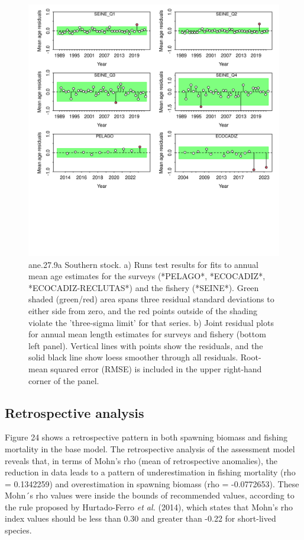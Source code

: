 \documentclass[
]{article}
\begin{document}
\begin{figure}[H]

{\centering \includegraphics[width=0.95\linewidth]{report/run/S1.0_4FLEETS_SelECO_RecIndex_Mnewfix/fig_runtest_residuals_age} 

}

\caption{ane.27.9a Southern stock. a) Runs test results for fits to annual mean age estimates for the surveys (*PELAGO*, *ECOCADIZ*, *ECOCADIZ-RECLUTAS*) and the fishery (*SEINE*). Green shaded (green/red) area spans three residual standard deviations to either side from zero, and the red points outside of the shading violate the 'three-sigma limit' for that series.  b) Joint residual plots for annual mean length estimates for surveys and fishery (bottom left panel).  Vertical lines with points show the residuals, and the solid black line show loess smoother through all residuals. Root-mean squared error (RMSE) is included in the upper right-hand corner of the panel.}\label{fig:unnamed-chunk-28}
\end{figure}

\hypertarget{retrospective-analysis}{%
\subsection{Retrospective analysis}\label{retrospective-analysis}}

Figure 24 shows a retrospective pattern in both spawning biomass and
fishing mortality in the base model. The retrospective analysis of the
assessment model reveals that, in terms of Mohn's rho (mean of
retrospective anomalies), the reduction in data leads to a pattern of
underestimation in fishing mortality (rho = 0.1342259) and
overestimation in spawning biomass (rho = -0.0772653). These Mohn´s rho
values were inside the bounds of recommended values, according to the
rule proposed by Hurtado-Ferro \emph{et al.} (2014), which states that
Mohn's rho index values should be less than 0.30 and greater than -0.22
for short-lived species.
\end{document}
